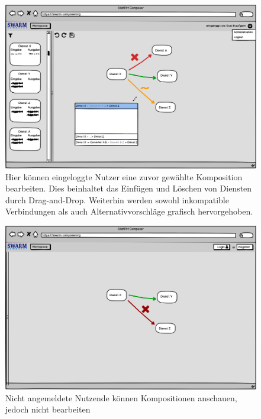 \begin{figure}[h]
	\centering
	\includegraphics[width=\textwidth]{img/editor}
	\caption{
            Hier können eingeloggte Nutzer eine zuvor gewählte Komposition
            bearbeiten. Dies beinhaltet das Einfügen und Löschen von Diensten durch
            Drag-and-Drop. Weiterhin werden sowohl inkompatible Verbindungen
            als auch Alternativvorschläge grafisch hervorgehoben.
        }
	\label{fig:editor-web}
\end{figure}

\begin{figure}[h]
	\centering
	\includegraphics[width=\textwidth]{img/nichtangemeldet}
	\caption{
          Nicht angemeldete Nutzende können Kompositionen anschauen, jedoch nicht bearbeiten
        }
	\label{fig:nichtangemeldet}
\end{figure}

